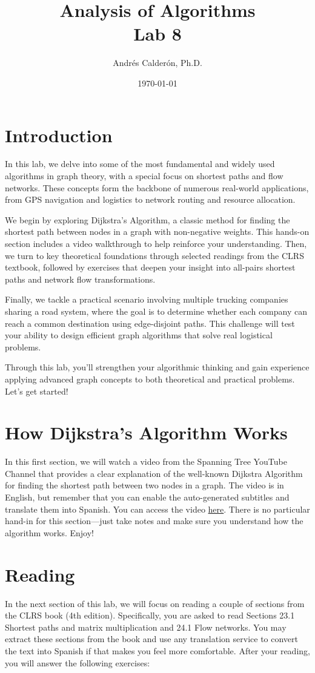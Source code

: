 \documentclass[11pt]{article}
\title{Analysis of Algorithms \\ Lab 8}
\author{Andrés Calderón, Ph.D.}
\date{\today}
\begin{document}
\maketitle

\section{Introduction}
In this lab, we delve into some of the most fundamental and widely used algorithms in graph theory, with a special focus on shortest paths and flow networks. These concepts form the backbone of numerous real-world applications, from GPS navigation and logistics to network routing and resource allocation.

We begin by exploring Dijkstra’s Algorithm, a classic method for finding the shortest path between nodes in a graph with non-negative weights. This hands-on section includes a video walkthrough to help reinforce your understanding. Then, we turn to key theoretical foundations through selected readings from the CLRS textbook, followed by exercises that deepen your insight into all-pairs shortest paths and network flow transformations.

Finally, we tackle a practical scenario involving multiple trucking companies sharing a road system, where the goal is to determine whether each company can reach a common destination using edge-disjoint paths. This challenge will test your ability to design efficient graph algorithms that solve real logistical problems.

Through this lab, you’ll strengthen your algorithmic thinking and gain experience applying advanced graph concepts to both theoretical and practical problems. Let’s get started!

\section{How Dijkstra's Algorithm Works}
In this first section, we will watch a video from the Spanning Tree YouTube Channel that provides a clear explanation of the well-known Dijkstra Algorithm for finding the shortest path between two nodes in a graph. The video is in English, but remember that you can enable the auto-generated subtitles and translate them into Spanish. You can access the video \href{https://youtu.be/EFg3u_E6eHU?si=tdkt-ImEfvEgrITp}{here}. There is no particular hand-in for this section—just take notes and make sure you understand how the algorithm works. Enjoy!

\section{Reading}
In the next section of this lab, we will focus on reading a couple of sections from the CLRS book (4th edition). Specifically, you are asked to read Sections 23.1 Shortest paths and matrix multiplication and 24.1 Flow networks. You may extract these sections from the book and use any translation service to convert the text into Spanish if that makes you feel more comfortable. After your reading, you will answer the following exercises:
\end{document}
